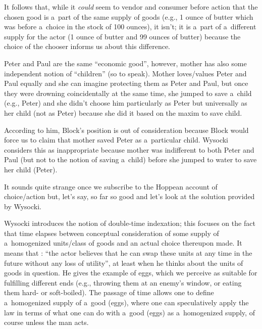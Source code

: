 It follows that, while it \textit{could} seem to vendor and consumer before action that the chosen good is a~part of the same supply of goods (e.g., 1 ounce of butter which was before a~choice in the stock of 100 ounces), it isn't; it is a~part of a~different supply for the actor (1 ounce of butter and 99 ounces of butter) because the choice of the chooser informs us about this difference.



Peter and Paul are the same ``economic good'', however, mother has also some independent notion of ``children'' (so to speak). Mother loves/values Peter and Paul equally and she can imagine protecting them as Peter and Paul, but once they were drowning coincidentally at the same time, she jumped to save a~child (e.g., Peter) and she didn't choose him particularly as Peter but universally as her child (not as Peter) because she did it based on the maxim to save child.



According to him, Block's position is out of consideration because Block would force us to claim that mother saved Peter as a~particular child. Wysocki considers this as inappropriate because mother was indifferent to both Peter and Paul (but not to the notion of saving a~child) before she jumped to water to save her child (Peter).



It sounds quite strange once we subscribe to the Hoppean account of choice/action but, let's say, so far so good and let's look at the solution provided by Wysocki.



Wysocki introduces the notion of double-time indexation; this focuses on the fact that time elapses between conceptual consideration of some supply of a~homogenized units/class of goods and an actual choice thereupon made. It means that 
\parencite[][p.39]{}: %
 ``the actor believes that he can swap these units at any time in the future without any loss of utility'', at least when he thinks about the units of goods in question. He gives the example of eggs, which we perceive as suitable for fulfilling different ends (e.g., throwing them at an enemy's window, or eating them hard- or soft-boiled). The passage of time allows one to define a~homogenized supply of a~good (eggs), where one can speculatively apply the law in terms of what one can do with a~good (eggs) as a~homogenized supply, of course unless the man acts.



